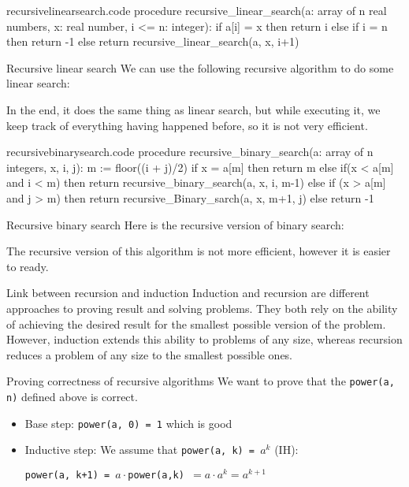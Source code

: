 \documentclass[a4paper]{article}
\begin{document}
\begin{filecontents*}[overwrite]{recursivelinearsearch.code}
procedure recursive_linear_search(a: array of n real numbers, x: real number, i <= n: integer):
    if a[i] = x then return i
    else if i = n then return -1
    else return recursive_linear_search(a, x, i+1)
\end{filecontents*}


\begin{parag}{Recursive linear search}
    We can use the following recursive algorithm to do some linear search:
    
    In the end, it does the same thing as linear search, but while executing it, we keep track of everything having happened before, so it is not very efficient.
\end{parag}

\begin{filecontents*}[overwrite]{recursivebinarysearch.code}
procedure recursive_binary_search(a: array of n integers, x, i, j):
    m := floor((i + j)/2)
    if x = a[m] then return m
    else if(x < a[m] and i < m) then return recursive_binary_search(a, x, i, m-1)
    else if (x > a[m] and j > m) then return recursive_Binary_sarch(a, x, m+1, j)
    else return -1
\end{filecontents*}

\begin{parag}{Recursive binary search}
    Here is the recursive version of binary search:

    The recursive version of this algorithm is not more efficient, however it is easier to ready.
\end{parag}

\begin{parag}{Link between recursion and induction}
    Induction and recursion are different approaches to proving result and solving problems. They both rely on the ability of achieving the desired result for the smallest possible version of the problem. However, induction extends this ability to problems of any size, whereas recursion reduces a problem of any size to the smallest possible ones.
\end{parag}

\begin{parag}{Proving correctness of recursive algorithms}
    We want to prove that the \texttt{power(a, n)} defined above is correct.

    \begin{itemize}
        \item Base step: \texttt{power(a, 0) = 1} which is good 
        \item Inductive step: We assume that \texttt{power(a, k) = $a^k$} (IH):

            \texttt{power(a, k+1) = $a\cdot$power(a,k) $= a\cdot a^k = a^{k+1}$}
    \end{itemize}
\end{parag}
\end{document}
